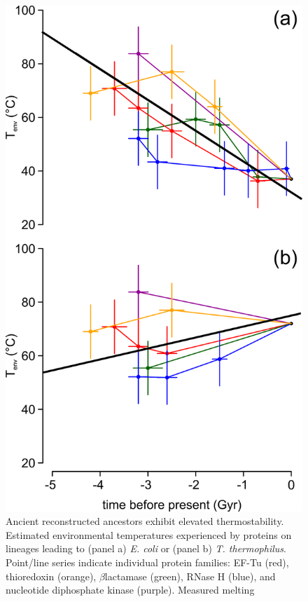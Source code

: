 \begin{figure}
\centering \includegraphics{ch2-fig2-smaller} \caption[Ancient Reconstructed Ancestors Exhibit Elevated\newline Thermostability]{Ancient reconstructed ancestors exhibit elevated thermostability.
Estimated environmental temperatures experienced by proteins on lineages
leading to (panel a) \textit{E. coli} or (panel b) \textit{T. thermophilus}.
Point/line series indicate individual protein families: EF-Tu (red),
thioredoxin (orange), $\beta$\textendash lactamase (green), RNase
H (blue), and nucleotide diphosphate kinase (purple). Measured melting
}
\end{figure}
